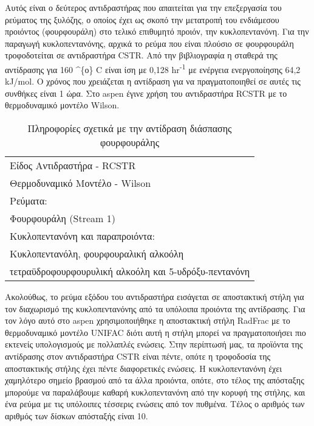 \documentclass[11pt]{article}
\begin{document}
Αυτός είναι ο δεύτερος αντιδραστήρας που απαιτείται για την επεξεργασία του ρεύματος της ξυλόζης, ο οποίος έχει ως σκοπό την μετατροπή του ενδιάμεσου προιόντος (φουρφουράλη) στο τελικό επιθυμητό προιόν, την κυκλοπεντανόνη. Για την παραγωγή κυκλοπεντανόνης, αρχικά το ρεύμα που είναι πλούσιο σε
φουρφουράλη τροφοδοτείται σε αντιδραστήρα CSTR. Από την βιβλιογραφία \cite{yuHighlySelectiveHydrogenative2022} η
σταθερά της αντίδρασης για 160 \^{}\{ο\} C είναι ίση με 0,128 hr\textsuperscript{-1} με
ενέργεια ενεργοποίησης 64,2 kJ/mol. Ο χρόνος που χρειάζεται η αντίδραση
για να πραγματοποιηθεί σε αυτές τις συνθήκες είναι 1 ώρα. Στο aspen
έγινε χρήση του αντιδραστήρα RCSTR με το θερμοδυναμικό μοντέλο Wilson.

\begin{table}[htbp]
\caption{Πληροφορίες σχετικά με την αντίδραση διάσπασης φουρφουράλης}
\centering
\begin{tabular}{l}
\hline
Είδος Αντιδραστήρα - RCSTR\\
Θερμοδυναμικό Μοντέλο - Wilson\\
Ρεύματα:\\
\hline
Φουρφουράλη (Stream 1)\\
\hline
Κυκλοπεντανόνη και παραπροιόντα:\\
Κυκλοπεντανόλη, φουρφουραλική αλκοόλη\\
τετραϋδροφουρφουρυλική αλκοόλη και 5-υδρόξυ-πεντανόνη\\
\hline
\end{tabular}
\end{table}

Ακολούθως, το ρεύμα εξόδου του αντιδραστήρα εισάγεται σε αποστακτική
στήλη για τον διαχωρισμό της κυκλοπεντανόνης από τα υπόλοιπα προιόντα της αντίδρασης. Για τον λόγο αυτό στο aspen χρησιμοποιήθηκε
η αποστακτική στήλη RadFrac με το θερμοδυναμικό μοντέλο UNIFAC διότι
αυτή η στήλη μπορεί να πραγματοποιήσει πιο εκτενείς υπολογισμούς με
πολλαπλές ενώσεις. Στην περίπτωσή μας, τα προϊόντα της αντίδρασης στον
αντιδραστήρα CSTR είναι πέντε, οπότε η τροφοδοσία της αποστακτικής
στήλης έχει πέντε διαφορετικές ενώσεις. Η κυκλοπεντανόνη έχει χαμηλότερο
σημείο βρασμού από τα άλλα προιόντα, οπότε, στο τέλος της απόσταξης
μπορούμε να παραλάβουμε καθαρή κυκλοπεντανόνη από την κορυφή της στήλης,
και ένα ρεύμα με τις υπόλοιπες τέσσερις ενώσεις από τον πυθμένα. Τέλος ο
αριθμός των αριθμός των δίσκων απόσταξής είναι 10.
\end{document}
